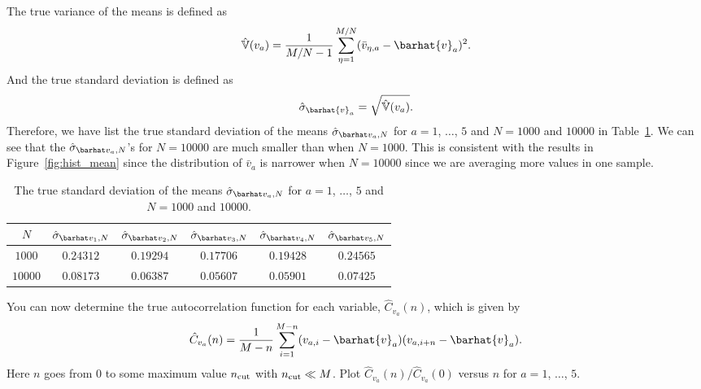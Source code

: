 The true variance of the means is defined as
%
\begin{equation}
    \hat{\mathbb{V}}(v_a) = \frac{ 1 }{ M/N - 1 }
    \sum_{\eta=1}^{M/N} (\bar{v}_{\eta,a} - \barhat{v}_a)^2.
\end{equation}
%
And the true standard deviation is defined as
%
\begin{equation}
    \hat{\sigma}_{\barhat{v}_a} = \sqrt{\hat{\mathbb{V}}(v_a)}.
\end{equation}
%
Therefore, we have list the true standard deviation of the means
$\sgbar{a}$ for $a = 1$, $\ldots$, $5$ and $N = 1000$ and $10000$
in Table~\ref{tab:truestd}.
We can see that the $\sgbar{a}$'s for $N = 10000$ are much smaller than
when $N = 1000$. This is consistent with the results in Figure~\ref{fig:hist_mean}
since the distribution of $\bar{v}_a$ is narrower when $N = 10000$ since
we are averaging more values in one sample.

\begin{table}[H]
    \centering
    \caption{The true standard deviation of the means
        $\sgbar{a}$ for $a = 1$, $\ldots$, $5$ and $N = 1000$ and $10000$.}
    \label{tab:truestd}
    \begin{tabular}{@{}cccccc@{}}
        \toprule
        $N$     & $\sgbar{1}$ & $\sgbar{2}$ & $\sgbar{3}$ & $\sgbar{4}$ & $\sgbar{5}$ \\
        \midrule
        $1000$  & $0.24312$   & $0.19294$   & $0.17706$   & $0.19428$   & $0.24565$   \\
        $10000$ & $0.08173$   & $0.06387$   & $0.05607$   & $0.05901$   & $0.07425$   \\
        \bottomrule
    \end{tabular}
\end{table}

\Question{} You can now determine the true autocorrelation function for each variable,
$\hat{C}_{v_a}(n)$, which is given by
%
\begin{equation}
    \hat{C}_{v_a}(n) = \frac{ 1 }{ M - n }
    \sum_{i=1}^{M-n} (v_{a,i} - \barhat{v}_a) (v_{a,i + n} - \barhat{v}_a).
\end{equation}
%
Here $n$ goes from $0$ to some maximum value $n_\textnormal{cut}$ with
$n_\textnormal{cut} \ll M$.
Plot $\hat{C}_{v_a}(n) / \hat{C}_{v_a}(0)$ versus $n$ for $a = 1$, $\ldots$, $5$.

